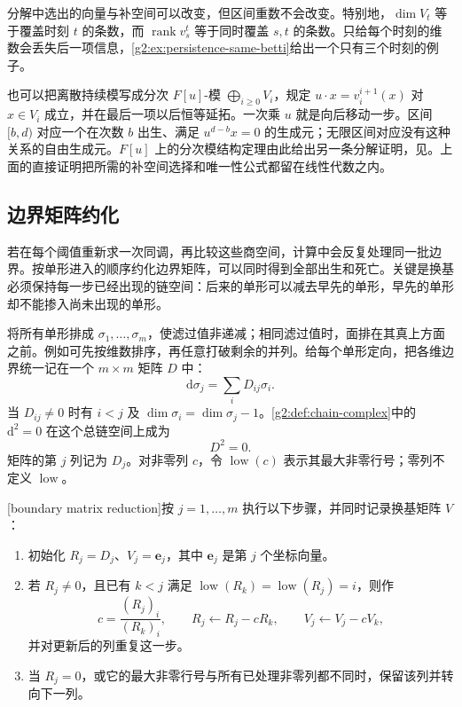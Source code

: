 分解中选出的向量与补空间可以改变，但区间重数不会改变。特别地，\(\dim V_t\) 等于覆盖时刻 \(t\) 的条数，而 \(\operatorname{rank}v_s^t\) 等于同时覆盖 \(s,t\) 的条数。只给每个时刻的维数会丢失后一项信息，\cref{g2:ex:persistence-same-betti}给出一个只有三个时刻的例子。

\ProseParagraphBreak

也可以把离散持续模写成分次 \(F[u]\)-模 \(\bigoplus_{i\geq0}V_i\)，规定 \(u\cdot x=v_i^{i+1}(x)\) 对 \(x\in V_i\) 成立，并在最后一项以后恒等延拓。一次乘 \(u\) 就是向后移动一步。区间 \([b,d)\) 对应一个在次数 \(b\) 出生、满足 \(u^{d-b}x=0\) 的生成元；无限区间对应没有这种关系的自由生成元。\(F[u]\) 上的分次模结构定理由此给出另一条分解证明，见\cite[第3节]{ZomorodianCarlsson2005Persistence}。上面的直接证明把所需的补空间选择和唯一性公式都留在线性代数之内。

\subsection{边界矩阵约化}
\label{g2:subsec:C03:03}

若在每个阈值重新求一次同调，再比较这些商空间，计算中会反复处理同一批边界。按单形进入的顺序约化边界矩阵，可以同时得到全部出生和死亡。关键是换基必须保持每一步已经出现的链空间：后来的单形可以减去早先的单形，早先的单形却不能掺入尚未出现的单形。

\ProseParagraphBreak

将所有单形排成 \(\sigma_1,\ldots,\sigma_m\)，使滤过值非递减；相同滤过值时，面排在其真上方面之前。例如可先按维数排序，再任意打破剩余的并列。给每个单形定向，把各维边界统一记在一个 \(m\times m\) 矩阵 \(D\) 中：
\[
	\mathrm d\sigma_j=\sum_iD_{ij}\sigma_i.
\]
当 \(D_{ij}\neq0\) 时有 \(i<j\) 及 \(\dim\sigma_i=\dim\sigma_j-1\)。\cref{g2:def:chain-complex}中的 \(\mathrm d^2=0\) 在这个总链空间上成为
\[
	D^2=0.
\]
矩阵的第 \(j\) 列记为 \(D_j\)。对非零列 \(c\)，令 \(\operatorname{low}(c)\) 表示其最大非零行号；零列不定义 \(\operatorname{low}\)。

\begin{definition}\label{g2:def:persistence-column-reduction}
	[boundary matrix reduction]按 \(j=1,\ldots,m\) 执行以下步骤，并同时记录换基矩阵 \(V\)：
	\begin{enumerate}
		\item 初始化 \(R_j=D_j\)、\(V_j=\mathbf e_j\)，其中 \(\mathbf e_j\) 是第 \(j\) 个坐标向量。
		\item 若 \(R_j\neq0\)，且已有 \(k<j\) 满足 \(\operatorname{low}(R_k)=\operatorname{low}(R_j)=i\)，则作
		\[
			c=\frac{(R_j)_i}{(R_k)_i},\qquad R_j\leftarrow R_j-cR_k,\qquad V_j\leftarrow V_j-cV_k,
		\]
		并对更新后的列重复这一步。
		\item 当 \(R_j=0\)，或它的最大非零行号与所有已处理非零列都不同时，保留该列并转向下一列。
	\end{enumerate}
\end{definition}

